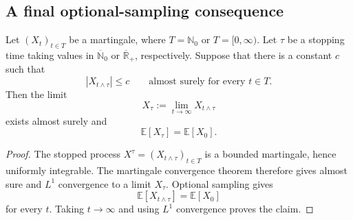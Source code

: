 \subsection*{A final optional-sampling consequence}
\begin{corollary}
Let $(X_t)_{t\in T}$ be a martingale, where $T=\mathbb{N}_0$ or
$T=[0,\infty)$. Let $\tau$ be a stopping time taking values in
$\overline{\mathbb{N}}_0$ or $\overline{\mathbb{R}}_+$, respectively.
Suppose that there is a constant $c$ such that
\[
 |X_{t\wedge\tau}|\le c\qquad\text{almost surely for every }t\in T.
\]
Then the limit
\[
 X_\tau:=\lim_{t\to\infty}X_{t\wedge\tau}
\]
exists almost surely and
\[
 \mathbb{E}[X_\tau]=\mathbb{E}[X_0].
\]
\end{corollary}
\begin{proof}
The stopped process $X^\tau=(X_{t\wedge\tau})_{t\in T}$ is a bounded
martingale, hence uniformly integrable. The martingale convergence theorem
therefore gives almost sure and $L^1$ convergence to a limit $X_\tau$.
Optional sampling gives
\[
 \mathbb{E}[X_{t\wedge\tau}]=\mathbb{E}[X_0]
\]
for every $t$. Taking $t\to\infty$ and using $L^1$ convergence proves the
claim.
\end{proof}
